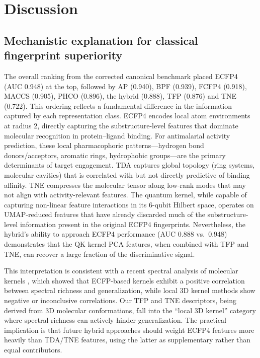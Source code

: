 \documentclass[11pt,a4paper]{article}
\begin{document}

\section{Discussion}



\subsection{Mechanistic explanation for classical fingerprint superiority}


The overall ranking from the corrected canonical benchmark placed ECFP4 (AUC \num{0.948}) at the top, followed by AP (0.940), BPF (0.939), FCFP4 (0.918), MACCS (0.905), PHCO (0.896), the hybrid (0.888), TFP (0.876) and TNE (0.722). This ordering reflects a fundamental difference in the information captured by each representation class. ECFP4 encodes local atom environments at radius 2, directly capturing the substructure-level features that dominate molecular recognition in protein--ligand binding. For antimalarial activity prediction, these local pharmacophoric patterns---hydrogen bond donors/acceptors, aromatic rings, hydrophobic groups---are the primary determinants of target engagement. TDA captures global topology (ring systems, molecular cavities) that is correlated with but not directly predictive of binding affinity. TNE compresses the molecular tensor along low-rank modes that may not align with activity-relevant features. The quantum kernel, while capable of capturing non-linear feature interactions in its 6-qubit Hilbert space, operates on UMAP-reduced features that have already discarded much of the substructure-level information present in the original ECFP4 fingerprints. Nevertheless, the hybrid's ability to approach ECFP4 performance (AUC \num{0.888} vs.\ 0.948) demonstrates that the QK kernel PCA features, when combined with TFP and TNE, can recover a large fraction of the discriminative signal.

This interpretation is consistent with a recent spectral analysis of molecular kernels \citep{jamali2025spectral}, which showed that ECFP-based kernels exhibit a positive correlation between spectral richness and generalization, while local 3D kernel methods show negative or inconclusive correlations. Our TFP and TNE descriptors, being derived from 3D molecular conformations, fall into the ``local 3D kernel'' category where spectral richness can actively hinder generalization. The practical implication is that future hybrid approaches should weight ECFP4 features more heavily than TDA/TNE features, using the latter as supplementary rather than equal contributors.
\end{document}
